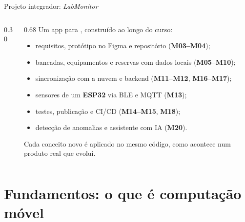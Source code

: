 \documentclass[aspectratio=169,10pt]{beamer}
\begin{document}
\begin{frame}{Projeto integrador: \emph{LabMonitor}}
  \begin{columns}[c]
    \begin{column}{0.30\textwidth}
      \centering
    \end{column}
    \begin{column}{0.68\textwidth}
      Um app para , construído ao longo do curso:
      \begin{itemize}
        \item requisitos, protótipo no Figma e repositório (\textbf{M03--M04});
        \item bancadas, equipamentos e reservas com dados locais (\textbf{M05--M10});
        \item sincronização com a nuvem e backend (\textbf{M11--M12}, \textbf{M16--M17});
        \item sensores de um \textbf{ESP32} via BLE e MQTT (\textbf{M13});
        \item testes, publicação e CI/CD (\textbf{M14--M15}, \textbf{M18});
        \item detecção de anomalias e assistente com IA (\textbf{M20}).
      \end{itemize}
      \begin{projeto}
        Cada conceito novo é aplicado no mesmo código, como acontece num produto real que evolui.
      \end{projeto}
    \end{column}
  \end{columns}
\end{frame}

\section{Fundamentos: o que é computação móvel}
\end{document}
